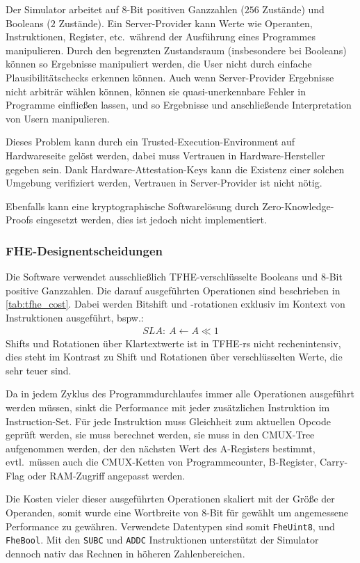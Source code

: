 Der Simulator arbeitet auf 8-Bit positiven Ganzzahlen ($256$ Zustände) und Booleans ($2$ Zustände).
Ein Server-Provider kann Werte wie Operanten, Instruktionen, Register, etc.\ während der Ausführung eines Programmes manipulieren.
Durch den begrenzten Zustandsraum (insbesondere bei Booleans) können so Ergebnisse manipuliert werden,
die User nicht durch einfache Plausibilitätschecks erkennen können.
Auch wenn Server-Provider Ergebnisse nicht arbiträr wählen können, können sie quasi-unerkennbare Fehler in Programme einfließen lassen,
und so Ergebnisse und anschließende Interpretation von Usern manipulieren.

Dieses Problem kann durch ein Trusted-Execution-Environment auf Hardwareseite gelöst werden, dabei muss Vertrauen in Hardware-Hersteller gegeben sein.
Dank Hardware-Attestation-Keys kann die Existenz einer solchen Umgebung verifiziert werden, Vertrauen in Server-Provider ist nicht nötig.

Ebenfalls kann eine kryptographische Softwarelösung durch Zero-Knowledge-Proofs eingesetzt werden, dies ist jedoch nicht implementiert.

\subsubsection{FHE-Designentscheidungen}
Die Software verwendet ausschließlich TFHE-verschlüsselte Booleans und 8-Bit positive Ganzzahlen.
Die darauf ausgeführten Operationen sind beschrieben in \autoref{tab:tfhe_cost}.
Dabei werden Bitshift und -rotationen exklusiv im Kontext von Instruktionen ausgeführt, bspw.:
\begin{align*}
    SLA:\ A \leftarrow A\ll1
\end{align*}
Shifts und Rotationen über Klartextwerte ist in TFHE-rs nicht rechenintensiv,
dies steht im Kontrast zu Shift und Rotationen über verschlüsselten Werte, die sehr teuer sind.

Da in jedem Zyklus des Programmdurchlaufes immer alle Operationen ausgeführt werden müssen,
sinkt die Performance mit jeder zusätzlichen Instruktion im Instruction-Set.
Für jede Instruktion muss Gleichheit zum aktuellen Opcode geprüft werden,
sie muss berechnet werden, sie muss in den CMUX-Tree aufgenommen werden,
der den nächsten Wert des A-Registers bestimmt,
evtl.\ müssen auch die CMUX-Ketten von Programmcounter, B-Register, Carry-Flag oder RAM-Zugriff angepasst werden.

Die Kosten vieler dieser ausgeführten Operationen skaliert mit der Größe der Operanden,
somit wurde eine Wortbreite von 8-Bit für gewählt um angemessene Performance zu gewähren.
Verwendete Datentypen sind somit \texttt{FheUint8}, und \texttt{FheBool}.
Mit den \texttt{SUBC} und \texttt{ADDC} Instruktionen unterstützt der Simulator dennoch nativ das Rechnen in höheren Zahlenbereichen.

